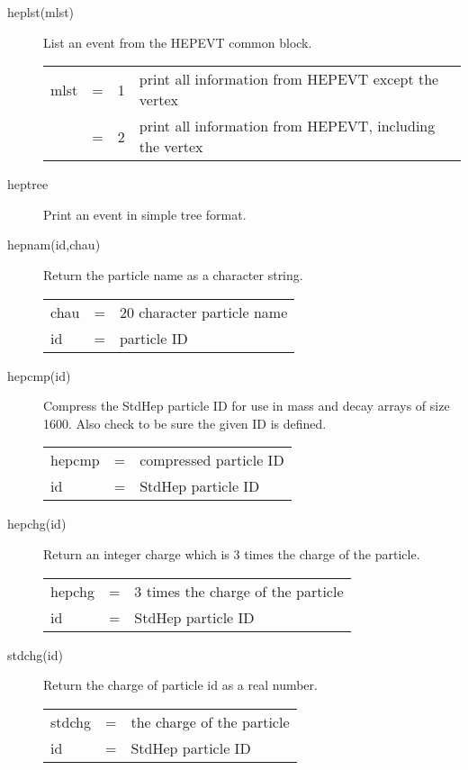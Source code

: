\begin{description}
\item[heplst(mlst) ] List an event from the HEPEVT common block.

\begin{tabular}{lcll}
mlst & = & 1 & print all information from HEPEVT except the vertex \\
     & = & 2 & print all information from HEPEVT, including the vertex \\
\end{tabular}

\item[heptree] Print an event in simple tree format. 
\item[hepnam(id,chau) ] Return the particle name as a character string.

\begin{tabular}{lcl}
chau & = & 20 character particle name \\
id   & = & particle ID \\
\end{tabular}

\item[hepcmp(id)]
 Compress the StdHep particle ID for use in mass and decay arrays of 
 size 1600.  Also check to be sure the given ID is defined.

\begin{tabular}{lcl}
hepcmp & = & compressed particle ID \\
id   & = & StdHep particle ID \\
\end{tabular}

\item[hepchg(id)]
 Return an integer charge which is 3 times the charge of the particle.

\begin{tabular}{lcl}
hepchg & = & 3 times the charge of the particle \\
id   & = & StdHep particle ID \\
\end{tabular}

\item[stdchg(id)]
 Return the charge of particle id as a real number.

\begin{tabular}{lcl}
stdchg & = & the charge of the particle \\
id   & = & StdHep particle ID \\
\end{tabular}


\end{description}

